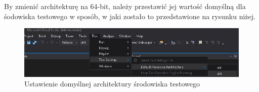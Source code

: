 By zmienić architekturę na 64-bit, należy przestawić jej wartość domyślną dla śodowiska testowego w sposób, w jaki zostało to przedstawione na rysunku niżej.

\begin{figure}[h]
	\includegraphics[width=15cm]{img/UnitTests_x64_architecture.png}
	\caption{Ustawienie domyślnej architektury środowiska testowego}
\end{figure}
